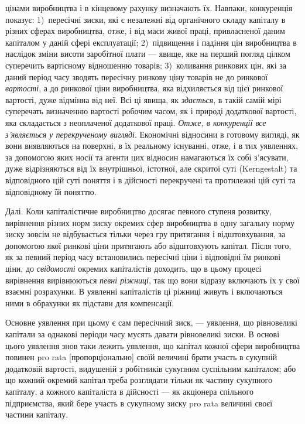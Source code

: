 \parcont{}  %
цінами виробництва і в кінцевому рахунку визначають їх. Навпаки,
конкуренція показує: 1)~пересічні зиски, які є незалежні від
органічного складу капіталу в різних сферах виробництва, отже,
і від маси живої праці, привласненої даним капіталом у даній сфері
експлуатації; 2)~підвищення і падіння цін виробництва в наслідок
зміни висоти заробітної плати — явище, яке на перший
погляд цілком суперечить вартісному відношенню товарів;
3)~коливання ринкових цін, які за даний період часу зводять
пересічну ринкову ціну товарів не до ринкової \emph{вартості}, а до
ринкової ціни виробництва, яка відхиляється від цієї ринкової
вартості, дуже відмінна від неї. Всі ці явища, як \emph{здається}, в такій
самій мірі суперечать визначенню вартості робочим часом,
як і природі додаткової вартості, яка складається з неоплаченої
додаткової праці. \emph{Отже, в конкуренції все з’являється у перекрученому
вигляді}. Економічні відносини в готовому вигляді, як
вони виявляються на поверхні, в їх реальному існуванні, отже,
і в тих уявленнях, за допомогою яких носії та агенти цих
відносин намагаються їх собі з’ясувати, дуже відрізняються
від їх внутрішньої, істотної, але скритої суті (Kerngestalt) та відповідного
цій суті поняття і в дійсності перекручені та протилежні
цій суті та відповідному їй поняттю.

Далі. Коли капіталістичне виробництво досягає певного ступеня
розвитку, вирівнення різних норм зиску окремих сфер виробництва
в одну загальну норму зиску зовсім не відбувається
тільки через гру притягання і відштовхування, за допомогою
якої ринкові ціни притягають або відштовхують капітал. Після
того, як за певний період часу встановились пересічні ціни
і відповідні їм ринкові ціни, до \emph{свідомості} окремих капіталістів
доходить, що в цьому процесі вирівнення вирівнюються \emph{певні
ріжниці}, так що вони відразу включають їх у свої взаємні розрахунки.
В уявленні капіталістів ці ріжниці живуть і включаються
ними в обрахунки як підстави для компенсації.

Основне уявлення при цьому є сам пересічний зиск, —
уявлення, що рівновеликі капітали за однакові періоди часу мусять
давати рівновеликі зиски. В основі цього уявлення знов
таки лежить уявлення, що капітал кожної сфери виробництва
повинен pro rata [пропорціонально] своїй величині брати участь
в сукупній додатковій вартості, видушеній з робітників сукупним
суспільним капіталом; або що кожний окремий капітал треба
розглядати тільки як частину сукупного капіталу, а кожного
капіталіста в дійсності — як акціонера спільного підприємства,
який бере участь в сукупному зиску pro rata величині своєї частини
капіталу.


